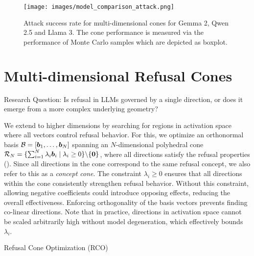\begin{figure*}[t]
    \centering
    \hspace*{5em} 
    \texttt{[image: images/model\_comparison\_attack.png]}
    \caption{Attack success rate for multi-dimensional cones for Gemma 2, Qwen 2.5 and Llama 3. The cone performance is measured via the performance of Monte Carlo samples which are depicted as boxplot.}
    \label{fig:subspace_model_comparison}
\end{figure*}
\section{Multi-dimensional Refusal Cones}\label{sec:cones}
\begin{graybox}
    Research Question: Is refusal in LLMs governed by a single direction, or does it emerge from a more complex underlying geometry?
\end{graybox}

We extend \oursacro to higher dimensions by searching for regions in activation space where all vectors control refusal behavior. For this, we optimize an orthonormal basis $\mathcal{B} = [{{\bm{b}}}_1, \dots, {{\bm{b}}}_N]$ spanning an $N$-dimensional polyhedral cone $\mathcal{R}_N = \{\sum_{i=1}^N \lambda_i {{\bm{b}}}_i \;|\; \lambda_i \geq 0\} \backslash \{\mathbf{0}\}$, where all directions  satisfy the refusal properties (). Since all directions in the cone correspond to the same refusal concept, we also refer to this as a \emph{concept cone}.
The constraint $\lambda_i \geq 0$ ensures that all directions within the cone consistently strengthen refusal behavior. Without this constraint, allowing negative coefficients could introduce opposing effects, reducing the overall effectiveness. Enforcing orthogonality of the basis vectors prevents finding co-linear directions.
Note that in practice, directions in activation space cannot be scaled arbitrarily high without model degeneration, which effectively bounds $\lambda_i$. 
\setlength{\textfloatsep}{8pt}
\begin{algorithm}
\caption{Refusal Cone Optimization (RCO)}
\label{algo:subspace}

\end{algorithm}

